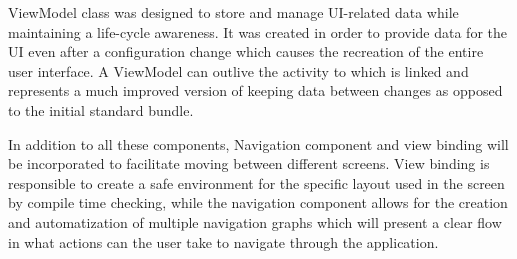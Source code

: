 ViewModel class was designed to store and manage UI-related data while maintaining a life-cycle awareness. It was created in order to provide data for the UI even after a configuration change which causes the recreation of the entire user interface. A ViewModel can outlive the activity to which is linked and represents a much improved version of keeping data between changes as opposed to the initial standard bundle.

In addition to all these components, Navigation component and view binding will be incorporated to facilitate moving between different screens. View binding is responsible to create a safe environment for the specific layout used in the screen by compile time checking, while the navigation component allows for the creation and automatization of multiple navigation graphs which will present a clear flow in what actions can the user take to navigate through the application.
